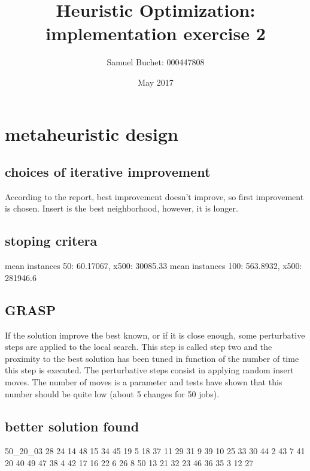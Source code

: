 \documentclass{article}
\title{Heuristic Optimization: implementation exercise 2}
\author{Samuel Buchet: 000447808}
\date{May 2017}
\begin{document}
\maketitle

\section{metaheuristic design}

\subsection{choices of iterative improvement}

According to the report, best improvement doesn't improve, so first improvement is chosen.
Insert is the best neighborhood, however, it is longer.

\subsection{stoping critera}

mean instances 50: 60.17067, x500: 30085.33\newline
mean instances 100: 563.8932, x500: 281946.6

\subsection{GRASP}

If the solution improve the best known, or if it is close enough, some perturbative steps are applied to the local search.
This step is called step two and the proximity to the best solution has been tuned in function of the number of time this step is executed.
The perturbative steps consist in applying random insert moves.
The number of moves is a parameter and tests have shown that this number should be quite low (about 5 changes for 50 jobs).

\subsection{better solution found}

50_20_03  28 24 14 48 15 34 45 19 5 18 37 11 29 31 9 39 10 25 33 30 44 2 43 7 41 20 40 49 47 38 4 42 17 16 22 6 26 8 50 13 21 32 23 46 36 35 3 12 27 
\end{document}
